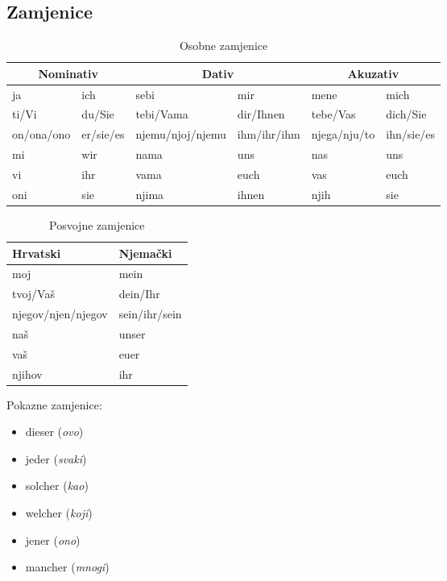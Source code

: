 \documentclass[12pt,german]{article}
\newcommand{\prijevod}[2]{\item #1 (\emph{#2})}
\begin{document}
\begin{multicols}{2}
\section{Zamjenice}
\begin{table*}[htb]
\caption{Osobne zamjenice}
\begin{tabular}{ll|ll|ll}
\toprule
  \multicolumn{2}{c}{Nominativ} & \multicolumn{2}{c}{Dativ} & \multicolumn{2}{c}{Akuzativ} \\
\midrule
  ja & ich & sebi & mir & mene & mich \\
  ti/Vi & du/Sie & tebi/Vama & dir/Ihnen & tebe/Vas & dich/Sie \\
  on/ona/ono & er/sie/es & njemu/njoj/njemu & ihm/ihr/ihm & njega/nju/to & ihn/sie/es \\
  mi & wir & nama & uns & nas & uns \\
  vi & ihr & vama & euch & vas & euch \\
  oni & sie & njima & ihnen & njih & sie \\
\bottomrule
\end{tabular}
\end{table*}

\begin{table}[H]
\caption{Posvojne zamjenice}
\begin{tabular}{ll}
\toprule
Hrvatski  &  Njemački \\
\midrule
moj & mein \\
tvoj/Vaš & dein/Ihr \\
njegov/njen/njegov & sein/ihr/sein \\
naš & unser \\
vaš & euer \\
njihov & ihr \\
\bottomrule
\end{tabular}
\end{table}

Pokazne zamjenice:
\begin{itemize}[nolistsep, label={}]
    \prijevod{dieser}{ovo}
    \prijevod{jeder}{svaki}
    \prijevod{solcher}{kao}
    \prijevod{welcher}{koji}
    \prijevod{jener}{ono}
    \prijevod{mancher}{mnogi}
\end{itemize}


\end{multicols}
\end{document}
